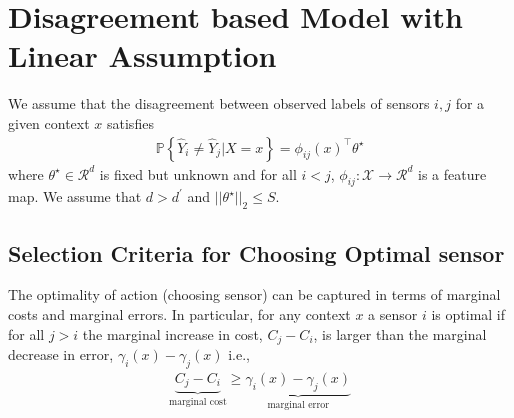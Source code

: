 \section{Disagreement based Model with Linear Assumption}
We assume that the disagreement between observed labels of sensors $i,j$ for a given context $x$ satisfies
%
\begin{align}
\mathbb{P}\left\{\widehat{Y}_i \neq \widehat{Y}_j|X=x\right\} = {\phi_{ij}(x)^\top\theta^\star}
\end{align}
where $\theta^\star \in \mathcal{R}^d$ is fixed but unknown and for all $i<j$, $\phi_{ij}: \mathcal{X} \rightarrow \mathcal{R}^d$ is a feature map. We assume that $d> d^\prime  $ and $||{\theta}^\star||_2 \le S$.

\subsection{Selection Criteria for Choosing Optimal sensor} The optimality of action (choosing sensor) can be captured in terms of marginal costs and marginal errors. In particular, for any context $x$ a sensor $i$ is optimal if for all $j > i$ the marginal increase in cost, $C_j - C_i$, is larger than the marginal decrease in error, $\gamma_i(x)-\gamma_j(x)$ i.e.,
\begin{align}
\label{equ:lin_cost_err}
\underbrace{C_j - C_i}_{\text{marginal cost}} \ge  \underbrace{\gamma_i(x)-\gamma_j(x)}_{\text{marginal error}}
\end{align}

